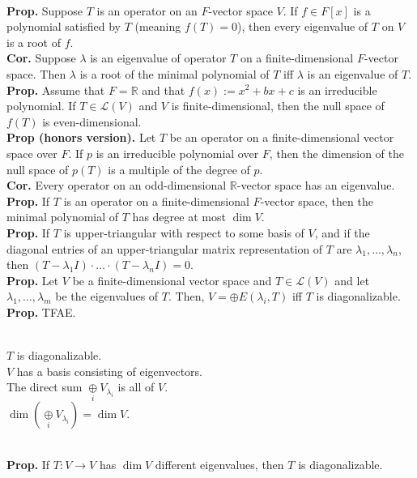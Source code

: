 	\\ \textbf{Prop. } Suppose $T$ is an operator on an $F$-vector space $V$. If $f \in F[x]$ is a polynomial satisfied by $T$ (meaning $f(T)=0$), then every eigenvalue of $T$ on $V$ is a root of $f$. 
	\\ \textbf{Cor. } Suppose $\lambda$ is an eigenvalue of operator $T$ on a finite-dimensional $F$-vector space. Then $\lambda$ is a root of the minimal polynomial of $T$ iff $\lambda$ is an eigenvalue of $T$. 
	\\ \textbf{Prop. } Assume that $F = \mathbb{R}$ and that $f(x) := x^2 + bx + c$ is an irreducible polynomial. If $T \in \mathscr{L}(V)$ and $V$ is finite-dimensional, then the null space of $f(T)$ is even-dimensional. 
	\\ \textbf{Prop (honors version). } Let $T$ be an operator on a finite-dimensional vector space over $F$. If $p$ is an irreducible polynomial over $F$, then the dimension of the null space of $p(T)$ is a multiple of the degree of $p$. 
	\\ \textbf{Cor. } Every operator on an odd-dimensional $\mathbb{R}$-vector space has an eigenvalue. 
	\\ \textbf{Prop. } If $T$ is an operator on a finite-dimensional $F$-vector space, then the minimal polynomial of $T$ has degree at most $\dim V$. 
	\\ \textbf{Prop. } If $T$ is upper-triangular with respect to some basis of $V$, and if the diagonal entries of an upper-triangular matrix representation of $T$ are $\lambda_1,\dots,\lambda_n$, then $(T-\lambda_1I) \cdot \dots \cdot (T-\lambda_nI)=0$. 
	\\ \textbf{Prop. } Let $V$ be a finite-dimensional vector space and $T \in \mathscr{L}(V)$ and let $\lambda_1,\dots,\lambda_m$ be the eigenvalues of $T$. Then, $V = \oplus E(\lambda_i, T)$ iff $T$ is diagonalizable. 
	\\ \textbf{Prop. } TFAE. 
	\begin{enumerate}
		\\ $T$ is diagonalizable. 
		\\ $V$ has a basis consisting of eigenvectors. 
		\\ The direct sum $\underset{i}{\oplus} V_{\lambda_i}$ is all of $V$. 
		\\ $\dim \left(\underset{i}{\oplus} V_{\lambda_i} \right) = \dim V$. 
	\end{enumerate}
	\\ \textbf{Prop. } If $T: V \to V$ has $\dim V$ different eigenvalues, then $T$ is diagonalizable. 
